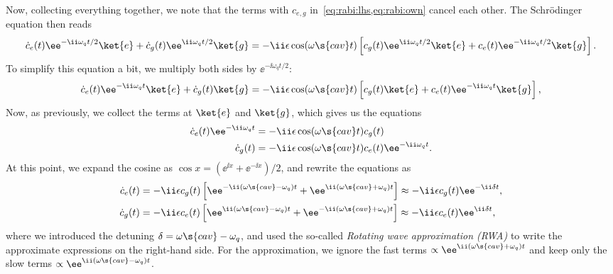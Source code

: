 \documentclass[fontsize=9pt,bookmarkpackage=false]{scrartcl}
\begin{document}
Now, collecting everything together, we note that the terms with $c_{e,g}$ in~\cref{eq:rabi:lhs,eq:rabi:own} cancel each other.
The Schrödinger equation then reads
\begin{equation}
  \dot c_e (t) \ee^{ - \ii \omega_q t / 2 } \ket{ e }
  +
  \dot c_g (t) \ee^{ \ii \omega_q t / 2 } \ket{ g } =
  - \ii \epsilon \cos ( \omega\s{cav} t )
  \left[
  c_g (t) \ee^{ \ii \omega_q t / 2 } \ket{ e }
  +
  c_e (t) \ee^{ - \ii \omega_q t / 2 } \ket{ g }
  \right].
\end{equation}
To simplify this equation a bit, we multiply both sides by $\ee^{ - \ii \omega_ q t / 2 }$:
\begin{equation}
  \dot c_e (t) \ee^{ - \ii \omega_q t} \ket{ e }
  +
  \dot c_g (t) \ket{ g } =
  - \ii \epsilon
  \cos( \omega\s{cav} t )
  \left[
  c_g (t) \ket{ e }
  +
  c_e (t) \ee^{ - \ii \omega_q t } \ket{ g }
  \right],
\end{equation}
Now, as previously, we collect the terms at $\ket{ e}$ and $\ket{ g }$, which gives us the equations
\begin{align}
  \dot c_e (t) \ee^{ - \ii \omega_q  t }
  & =
  - \ii \epsilon \cos ( \omega\s{cav} t ) c_g (t)
  \\
  \dot c_g (t)
  & =
  - \ii \epsilon \cos ( \omega\s{cav} t ) c_e (t) \ee^{ - \ii\omega_q t }.
\end{align}
At this point, we expand the cosine as $\cos x = ( \ee^{ \ii x } + \ee^{ - \ii x } ) / 2 $, and rewrite the equations as
\begin{align}
  \label{eq:rabi:cedot}
  \dot c_e (t) & =
  - \ii \epsilon c_g (t)
  \left[
    \ee^{ - \ii ( \omega\s{cav} - \omega_q ) t }
    +
    \ee^{ \ii ( \omega\s{cav} + \omega_q ) t }
  \right]
  \approx
  - \ii \epsilon c_g (t) \ee^{ - \ii \delta t }
  ,
  \\
  \dot c_g (t) & =
  - \ii \epsilon c_e (t)
  \left[
    \ee^{ \ii ( \omega\s{cav} - \omega_q ) t }
    +
    \ee^{ - \ii ( \omega\s{cav} + \omega_q ) t }
  \right]
  \approx
  - \ii \epsilon c_e (t) \ee^{ \ii \delta t }
  ,
\end{align}
where we introduced the detuning $\delta = \omega\s{cav} - \omega_q$, and used the so-called \emph{Rotating wave approximation (RWA)} to write the approximate expressions on the right-hand side.
For the approximation, we ignore the fast terms $\propto \ee^{ \ii ( \omega\s{cav} + \omega_q ) t }$  and keep only the slow terms $\propto \ee^{ \ii ( \omega\s{cav} - \omega_q ) t }$.
\end{document}
